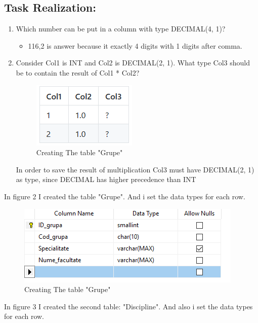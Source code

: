 \documentclass[12pt]{article}
\begin{document}
        \subsection*{Task Realization:}
        \begin{enumerate}
                \item  Which number can be put in a column with type DECIMAL(4, 1)?
                \begin{itemize}
                        \item 116,2 is answer because it exactly 4 digits with 1 digits after comma.
        
                \end{itemize}
                \item Consider Col1 is INT and Col2 is DECIMAL(2, 1). What type Col3 should be to contain the result of Col1 * Col2?
                \begin{figure}[H]
                        \centering
                        \includegraphics[width=.35\textwidth]{task2.png}
                        \caption{Creating The table "Grupe"}
                \end{figure}
                \vspace{0.5 cm}

                In order to save the result of multiplication Col3 must have DECIMAL(2, 1) as type, since DECIMAL has higher precedence than INT
        \end{enumerate}
       

        
        In figure 2 I created the table "Grupe". And i set the data types for each row.
        \begin{figure}[H]
                \centering
                \includegraphics[width=.95\textwidth]{img1.png}
                \caption{Creating The table "Grupe"}
        \end{figure}
        \vspace{0.5 cm}
        In figure 3 I created the second table: "Discipline". And also i set the data types for each row. 
        
\end{document}
